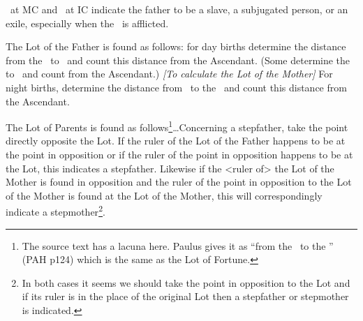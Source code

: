 \Saturn\, at MC and \Jupiter\, at IC indicate the
father to be a slave, a subjugated person, or an exile, especially when the \Sun\, is afflicted.

The Lot of the Father is found as follows: for day births determine the distance from the \Sun\, to \Saturn\, and count this distance from the Ascendant. (Some determine the \Sun\, to \Jupiter\, and count from the Ascendant.) \textsl{[To calculate the Lot of the Mother]} For night births, determine the distance from \Venus\, to the \Moon\, and count this distance from the Ascendant. 

The Lot of Parents is found as follows\footnote{The source text has a lacuna here. Paulus gives it as ``from the \Sun\, to the \Moon'' (PAH p124) which is the same as the Lot of Fortune.}\ldots Concerning a stepfather, take the point directly opposite the Lot. If the ruler of the Lot of the Father happens to be at the point in opposition or if the ruler of the point in opposition happens to be at the Lot, this indicates a stepfather. Likewise if the <ruler of> the Lot of the Mother is found in opposition and the ruler of the point in opposition to the Lot of the Mother is found at the Lot of the Mother, this will
correspondingly indicate a stepmother\footnote{In both cases it seems we should take the point in opposition to the Lot and if its ruler is in the place of the original Lot then a stepfather or stepmother is indicated.}.

\newpage